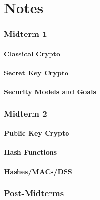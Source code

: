 \documentclass[12pt]{article}
\begin{document}
\part{Notes}

\hypertarget{midterm-1}{%
\section{Midterm 1}\label{midterm-1}}

\hypertarget{classical-crypto}{%
\subsection{Classical Crypto}\label{classical-crypto}}

\hypertarget{secret-key-crypto}{%
\subsection{Secret Key Crypto}\label{secret-key-crypto}}

\hypertarget{security-models-and-goals}{%
\subsection{Security Models and Goals}\label{security-models-and-goals}}

\hypertarget{midterm-2}{%
\section{Midterm 2}\label{midterm-2}}

\hypertarget{public-key-crypto}{%
\subsection{Public Key Crypto}\label{public-key-crypto}}

\hypertarget{hash-functions}{%
\subsection{Hash Functions}\label{hash-functions}}

\hypertarget{hashesmacsdss}{%
\subsection{Hashes/MACs/DSS}\label{hashesmacsdss}}

\hypertarget{post-midterms}{%
\section{Post-Midterms}\label{post-midterms}}
\end{document}
